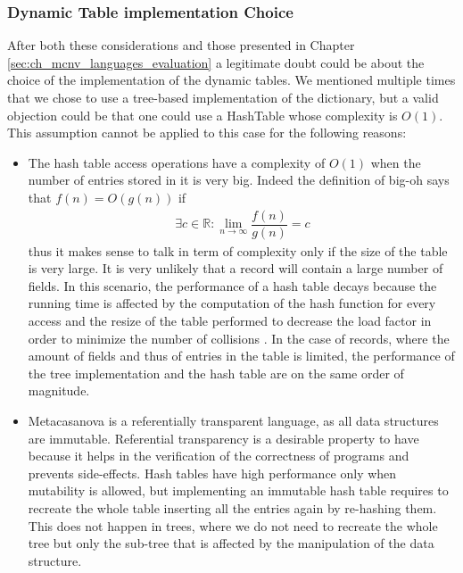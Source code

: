 \subsubsection{Dynamic Table implementation Choice}
After both these considerations and those presented in Chapter \ref{sec:ch_mcnv_languages_evaluation} a legitimate doubt could be about the choice of the implementation of the dynamic tables. We mentioned multiple times that we chose to use a tree-based implementation of the dictionary, but a valid objection could be that one could use a HashTable whose complexity is $O(1)$. This assumption cannot be applied to this case for the following reasons:

\begin{itemize}
\item The hash table access operations have a complexity of $O(1)$ when the number of entries stored in it is very big. Indeed the definition of big-oh says that $f(n) = O(g(n))$ if
\begin{align*}
\exists c \in \mathbb{R}: \lim_{n \to \infty}\dfrac{f(n)}{g(n)} = c
\end{align*}
\noindent
thus it makes sense to talk in term of complexity only if the size of the table is very large. It is very unlikely that a record will contain a large number of fields. In this scenario, the performance of a hash table decays because the running time is affected by the computation of the hash function for every access and the resize of the table performed to decrease the load factor in order to minimize the number of collisions \cite{cormen2001introduction}. In the case of records, where the amount of fields and thus of entries in the table is limited, the performance of the tree implementation and the hash table are on the same order of magnitude.
\item  Metacasanova is a referentially transparent language, as all data structures are immutable. Referential transparency is a desirable property to have because it helps in the verification of the correctness of programs \cite{linger1988case, trammell1996incremental} and prevents side-effects. Hash tables have high performance only when mutability is allowed, but implementing an immutable hash table requires to recreate the whole table inserting all the entries again by re-hashing them. This does not happen in trees, where we do not need to recreate the whole tree but only the sub-tree that is affected by the manipulation of the data structure.
\end{itemize}

